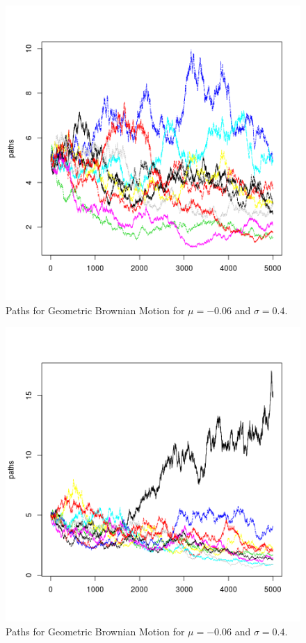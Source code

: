 \documentclass{article}
\begin{document}
		\begin{figure}[!ht]
  			\includegraphics[width=\linewidth]{pic/que2_1.png}
 			 \caption{Paths for Geometric Brownian Motion for $\mu=-0.06$ and $\sigma=0.4$.}
  			\label{fig:hist1_1}
		\end{figure}
		
		\begin{figure}[!ht]
  			\includegraphics[width=\linewidth]{pic/que2_2.png}
 			 \caption{Paths for Geometric Brownian Motion for $\mu=-0.06$ and $\sigma=0.4$.}
  			\label{fig:hist1_1}
		\end{figure}
		
\end{document}
